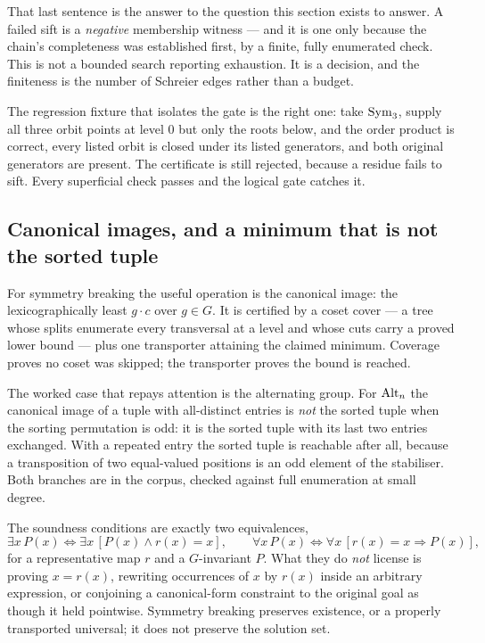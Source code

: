 That last sentence is the answer to the question this section exists to
answer. A failed sift is a \emph{negative} membership witness --- and it is one
only because the chain's completeness was established first, by a finite,
fully enumerated check. This is not a bounded search reporting exhaustion. It
is a decision, and the finiteness is the number of Schreier edges rather than a
budget.

The regression fixture that isolates the gate is the right one: take
$\operatorname{Sym}_3$, supply all three orbit points at level $0$ but only the roots below,
and the order product is correct, every listed orbit is closed under its listed
generators, and both original generators are present. The certificate is still
rejected, because a residue fails to sift. Every superficial check passes and
the logical gate catches it.

\subsection{Canonical images, and a minimum that is not the sorted tuple}

For symmetry breaking the useful operation is the canonical image: the
lexicographically least $g\cdot c$ over $g\in G$. It is certified by a coset
cover --- a tree whose splits enumerate every transversal at a level and whose
cuts carry a proved lower bound --- plus one transporter attaining the claimed
minimum. Coverage proves no coset was skipped; the transporter proves the bound
is reached.

The worked case that repays attention is the alternating group. For
$\operatorname{Alt}_n$ the canonical image of a tuple with all-distinct entries is
\emph{not} the sorted tuple when the sorting permutation is odd: it is the
sorted tuple with its last two entries exchanged. With a repeated entry the
sorted tuple is reachable after all, because a transposition of two
equal-valued positions is an odd element of the stabiliser. Both branches are
in the corpus, checked against full enumeration at small degree.

\begin{remark}
The soundness conditions are exactly two equivalences,
\[
 \exists x\,P(x)\iff\exists x\,[P(x)\wedge r(x)=x],\qquad
 \forall x\,P(x)\iff\forall x\,[r(x)=x\Rightarrow P(x)],
\]
for a representative map $r$ and a $G$-invariant $P$. What they do \emph{not}
license is proving $x=r(x)$, rewriting occurrences of $x$ by $r(x)$ inside an
arbitrary expression, or conjoining a canonical-form constraint to the original
goal as though it held pointwise. Symmetry breaking preserves existence, or a
properly transported universal; it does not preserve the solution set.
\end{remark}

